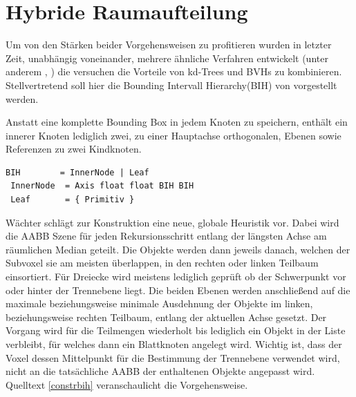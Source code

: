 \section{Hybride Raumaufteilung}

Um von den Stärken beider Vorgehensweisen zu profitieren wurden in letzter Zeit, unabhängig voneinander, mehrere ähnliche Verfahren entwickelt (unter anderem \cite{ZunigaUhlmann06}, \cite{HHS2006}) die versuchen die Vorteile von kd-Trees und BVHs zu kombinieren. Stellvertretend soll hier die Bounding Intervall Hierarchy(BIH) von \cite{BIH06} vorgestellt werden.

Anstatt eine komplette Bounding Box in jedem Knoten zu speichern, enthält ein innerer Knoten lediglich zwei, zu einer Hauptachse orthogonalen, Ebenen sowie Referenzen zu zwei Kindknoten.
\begin{lstlisting}[float,caption=Die Bounding Interval Hierarchy Inter Datenstruktur in erweiterter Backus-Naur-Form,label=bihdef]
 BIH        = InnerNode | Leaf
 InnerNode  = Axis float float BIH BIH
 Leaf       = { Primitiv }
\end{lstlisting}

Wächter schlägt zur Konstruktion eine neue, globale Heuristik vor. Dabei wird die AABB Szene für jeden Rekursionsschritt entlang der längsten Achse am räumlichen Median geteilt. Die Objekte werden dann jeweils danach, welchen der Subvoxel sie am meisten überlappen, in den rechten oder linken Teilbaum einsortiert. Für Dreiecke wird meistens lediglich geprüft ob der Schwerpunkt vor oder hinter der Trennebene liegt. Die beiden Ebenen werden anschließend auf die maximale beziehungsweise minimale Ausdehnung der Objekte im linken, beziehungsweise rechten Teilbaum, entlang der aktuellen Achse gesetzt.
Der Vorgang wird für die Teilmengen wiederholt bis lediglich ein Objekt in der Liste verbleibt, für welches dann ein Blattknoten angelegt wird. Wichtig ist, dass der Voxel dessen Mittelpunkt für die Bestimmung der Trennebene verwendet wird, nicht an die tatsächliche AABB der enthaltenen Objekte angepasst wird. Quelltext \ref{constrbih} veranschaulicht die Vorgehensweise.

